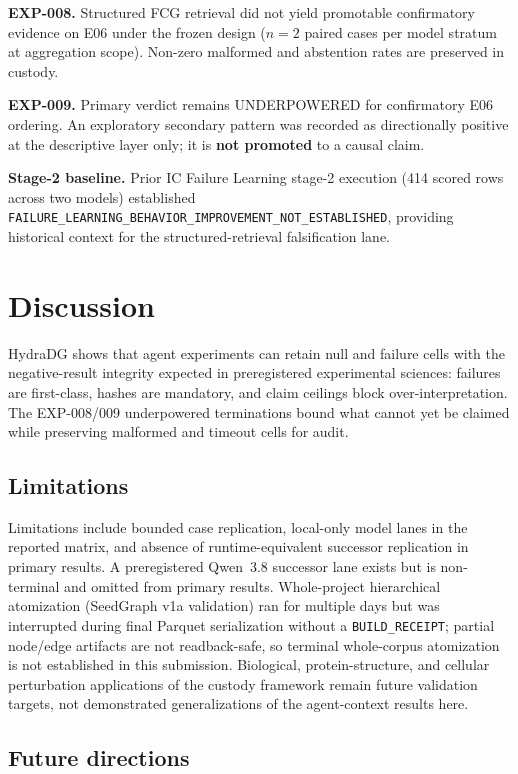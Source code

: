 \documentclass{article}
\begin{document}
\textbf{EXP-008.} Structured FCG retrieval did not yield promotable confirmatory evidence on E06 under the frozen design ($n=2$ paired cases per model stratum at aggregation scope). Non-zero malformed and abstention rates are preserved in custody.

\textbf{EXP-009.} Primary verdict remains UNDERPOWERED for confirmatory E06 ordering. An exploratory secondary pattern was recorded as directionally positive at the descriptive layer only; it is \textbf{not promoted} to a causal claim.

\textbf{Stage-2 baseline.} Prior IC Failure Learning stage-2 execution (414 scored rows across two models) established \texttt{FAILURE\_LEARNING\_BEHAVIOR\_IMPROVEMENT\_NOT\_ESTABLISHED}, providing historical context for the structured-retrieval falsification lane.

\section{Discussion}

HydraDG shows that agent experiments can retain null and failure cells with the negative-result integrity expected in preregistered experimental sciences: failures are first-class, hashes are mandatory, and claim ceilings block over-interpretation.
The EXP-008/009 underpowered terminations bound what cannot yet be claimed while preserving malformed and timeout cells for audit.

\subsection{Limitations}

Limitations include bounded case replication, local-only model lanes in the reported matrix, and absence of runtime-equivalent successor replication in primary results.
A preregistered Qwen~3.8 successor lane exists but is non-terminal and omitted from primary results.
Whole-project hierarchical atomization (SeedGraph v1a validation) ran for multiple days but was interrupted during final Parquet serialization without a \texttt{BUILD\_RECEIPT}; partial node/edge artifacts are not readback-safe, so terminal whole-corpus atomization is not established in this submission.
Biological, protein-structure, and cellular perturbation applications of the custody framework remain future validation targets, not demonstrated generalizations of the agent-context results here.

\subsection{Future directions}
\end{document}
